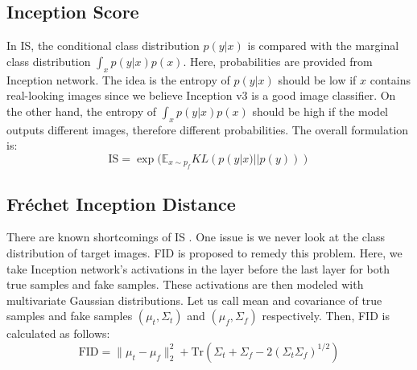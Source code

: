\documentclass[a4paper,onesided,12pt]{report}
\begin{document}
\subsection{Inception Score}
\label{subsec:is}
In IS, the conditional class distribution $p(y|x)$ is compared with the marginal class distribution $\int_x p(y|x) p(x)$. Here, probabilities are provided from Inception network. The idea is the entropy of $p(y|x)$ should be low if $x$ contains real-looking images since we believe Inception v3 is a good image classifier. On the other hand, the entropy of $\int_x p(y | x) p(x)$ should be high if the model outputs different images, therefore different probabilities. The overall formulation is:
\begin{equation}
\label{eq:is}
\text{IS}=\exp (\mathbb{E}_{x \sim p_f} KL (p(y|x) || p(y))) 
\end{equation}

\subsection{Fr\'echet Inception Distance}
\label{subsec:fid}
There are known shortcomings of IS \cite{heusel2017gans,barratt2018note}. One issue is we never look at the class distribution of target images. FID is proposed to remedy this problem. Here, we take Inception network's activations in the layer before the last layer for both true samples and fake samples. These activations are then modeled with multivariate Gaussian distributions. Let us call mean and covariance of true samples and fake samples $(\mu_t, \Sigma_t)$ and $(\mu_f, \Sigma_f)$ respectively. Then, FID is calculated as follows:
\begin{equation}
\label{eq:fid}
\text{FID} = \| \mu_t - \mu_f \|_2^2 + \text{Tr}(\Sigma_t + \Sigma_f - 2(\Sigma_t \Sigma_f)^{1/2})
\end{equation}
\end{document}
